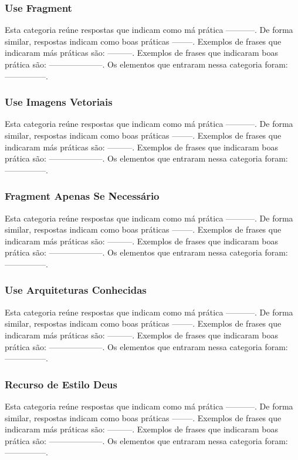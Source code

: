 \subsubsection{Use Fragment}
Esta categoria re\'une respostas que indicam como m\'a pr\'atica -----------. De forma similar, respostas indicam como boas pr\'aticas --------. Exemplos de frases que indicaram m\'as pr\'aticas s\~ao: ---------. Exemplos de frases que indicaram boas pr\'atica s\~ao: --------------------. Os elementos que entraram nessa categoria foram: ---------------. 

\subsubsection{Use Imagens Vetoriais}
Esta categoria re\'une respostas que indicam como m\'a pr\'atica -----------. De forma similar, respostas indicam como boas pr\'aticas --------. Exemplos de frases que indicaram m\'as pr\'aticas s\~ao: ---------. Exemplos de frases que indicaram boas pr\'atica s\~ao: --------------------. Os elementos que entraram nessa categoria foram: ---------------. 

\subsubsection{Fragment Apenas Se Necessário}
Esta categoria re\'une respostas que indicam como m\'a pr\'atica -----------. De forma similar, respostas indicam como boas pr\'aticas --------. Exemplos de frases que indicaram m\'as pr\'aticas s\~ao: ---------. Exemplos de frases que indicaram boas pr\'atica s\~ao: --------------------. Os elementos que entraram nessa categoria foram: ---------------. 

\subsubsection{Use Arquiteturas Conhecidas}
Esta categoria re\'une respostas que indicam como m\'a pr\'atica -----------. De forma similar, respostas indicam como boas pr\'aticas --------. Exemplos de frases que indicaram m\'as pr\'aticas s\~ao: ---------. Exemplos de frases que indicaram boas pr\'atica s\~ao: --------------------. Os elementos que entraram nessa categoria foram: ---------------. 

\subsubsection{Recurso de Estilo Deus}
Esta categoria re\'une respostas que indicam como m\'a pr\'atica -----------. De forma similar, respostas indicam como boas pr\'aticas --------. Exemplos de frases que indicaram m\'as pr\'aticas s\~ao: ---------. Exemplos de frases que indicaram boas pr\'atica s\~ao: --------------------. Os elementos que entraram nessa categoria foram: ---------------. 


